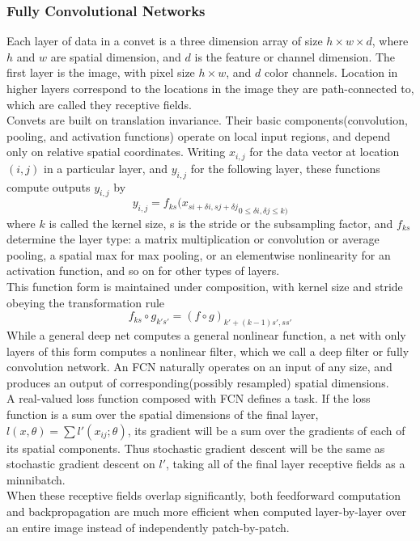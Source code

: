 \documentclass[final]{cvpr}
\begin{document}
\subsubsection{Fully Convolutional Networks}
Each layer of data in a convet is a three dimension array of size $h\times w\times d$, where $h$ and $w$ are spatial dimension, and $d$ is the feature or channel dimension. The first layer is the image, with pixel size $h\times w$, and $d$ color channels. Location in higher layers correspond to the locations in the image they are path-connected to, which are called they receptive fields.\\
\indent Convets are built on translation invariance. Their basic components(convolution, pooling, and activation functions) operate on local input regions, and depend only on relative spatial coordinates. Writing $x_{i,j}$ for the data vector at location $(i,j)$ in a particular layer, and $y_{i,j}$ for the following layer, these functions compute outputs $y_{i,j}$ by
\[y_{i,j} = f_{ks}({x_{si+\delta i, sj+\delta j}}_{0\leq \delta i,\delta j\leq k)}\]
where $k$ is called the kernel size, s is the stride or the subsampling factor, and $f_{ks}$ determine the layer type: a matrix multiplication or convolution or average pooling, a spatial max for max pooling, or an elementwise nonlinearity for an activation function, and so on for other types of layers.\\
\indent This function form is maintained under composition, with kernel size and  stride obeying the transformation rule
\[ f_{ks}\circ g_{k's'} = (f\circ g)_{k'+(k-1)s',ss'}\]
While a general deep net computes a general nonlinear function, a net with only layers of this form computes a nonlinear filter, which we call a deep filter or fully convolution network. An FCN naturally operates on an input of any size, and produces an output of corresponding(possibly resampled) spatial dimensions.\\
\indent A real-valued loss function composed with FCN defines a task. If the loss function is a sum over the spatial dimensions of the final layer, $l(x,\theta)=\sum l'(x_{ij};\theta)$, its gradient will be a sum over the gradients of each of its spatial components. Thus stochastic gradient descent will be the same as stochastic gradient descent on $l'$, taking all of the final layer receptive fields as a minnibatch.\\
\indent When these receptive fields overlap significantly, both feedforward computation and backpropagation are much more efficient when computed layer-by-layer over an entire image instead of independently patch-by-patch.
\end{document}
